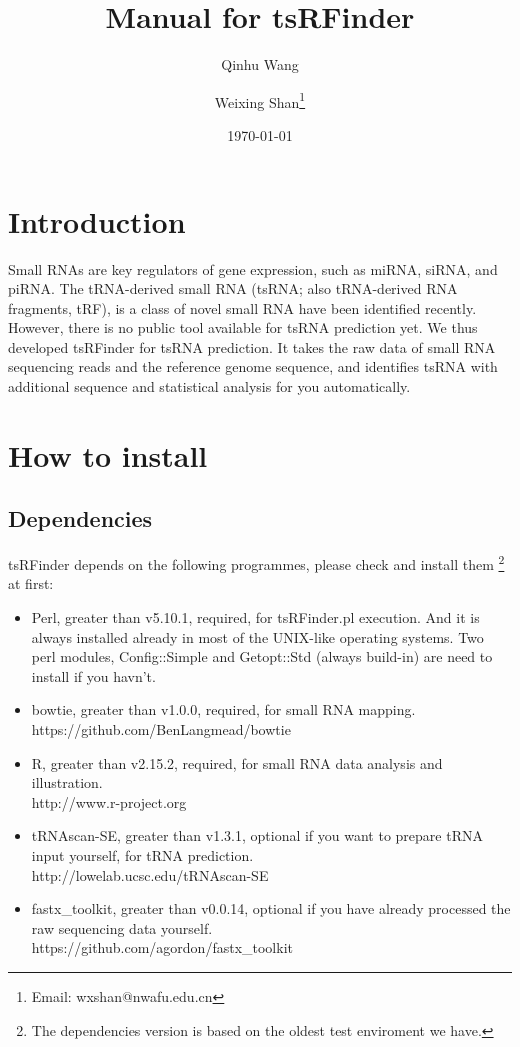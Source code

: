 \documentclass[11pt, a4paper]{article}
\title{Manual for tsRFinder}
\author{Qinhu Wang}
\author{Weixing Shan\thanks{Email: wxshan@nwafu.edu.cn}}
\affil{Northwest A\&F University}
\date{\today}
\begin{document}
\maketitle
\tableofcontents

\section{Introduction}

Small RNAs are key regulators of gene expression, such as miRNA, siRNA, and piRNA. The tRNA-derived small RNA (tsRNA; also tRNA-derived RNA fragments, tRF), is a class of novel small RNA have been identified recently. However, there is no public tool available for tsRNA prediction yet. We thus developed tsRFinder for tsRNA prediction. It takes the raw data of small RNA sequencing reads and the reference genome sequence, and identifies tsRNA with additional sequence and statistical analysis for you automatically.

\section{How to install}

\subsection{Dependencies}

tsRFinder depends on the following programmes, please check and install them \footnote{The dependencies version is based on the oldest test enviroment we have.} at first:

\begin{itemize}

\item Perl, greater than v5.10.1, required, for tsRFinder.pl execution. And it is always installed already in most of the UNIX-like operating systems.
Two perl modules, Config::Simple and Getopt::Std (always build-in) are need to install if you havn't.
\item bowtie, greater than v1.0.0, required, for small RNA mapping. \\https://github.com/BenLangmead/bowtie
\item R, greater than v2.15.2, required, for small RNA data analysis and illustration. \\http://www.r-project.org
\item tRNAscan-SE, greater than v1.3.1, optional if you want to prepare tRNA input yourself, for tRNA prediction. \\http://lowelab.ucsc.edu/tRNAscan-SE
\item fastx\_toolkit, greater than v0.0.14, optional if you have already processed the raw sequencing data yourself. \\https://github.com/agordon/fastx\_toolkit

\end{itemize}
\end{document}
